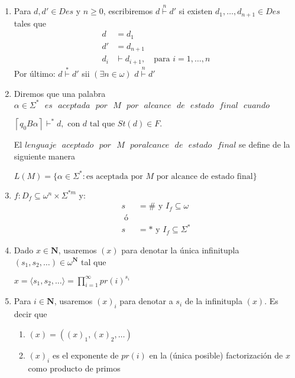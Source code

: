 \documentclass{article}
\begin{document}
\begin{enumerate}
        \item Para $d, d' \in Des$ y $n \geq 0$, escribiremos $d \overset{n}{\vdash} d'$
        si existen $d_1, \dots, d_{n+1} \in Des$ tales que 
        \begin{align*}
                d &= d_1 \\
                d' &= d_{n+1} \\
                d_i &\vdash d_{i+1}, \quad \text{para } i = 1, \ldots, n
        \end{align*}
        Por último: $d \overset{*}{\vdash} d'$ sii $(\exists n \in \omega)$ $d \overset{n}{\vdash} d'$

        \item Diremos que una palabra $\alpha \in \Sigma^{*} \text{ } es \text{ } 
        aceptada \text{ } por \text{ } M \text{ } por \text{ } alcance \text{ }
        de \text{ } estado \text{ } final \text{ } cuando$
        \begin{center}
                $\left\lceil q_0 B \alpha \right\rceil \vdash^* d, 
                \text{ con } d \text{ tal que } St(d) \in F.$
        \end{center}
        El $lenguaje \text{ } aceptado \text{ } por \text{ } M \text{ } por alcance
        \text{ } de \text{ } estado \text{ } final$ se define de la siguiente manera
        \begin{center}
                $L(M) = \{ \alpha \in \Sigma^{*}: \text{es aceptada por } M \text{ por 
                alcance de estado final}\}$
        \end{center}

        \item $f : D_f \subseteq \omega^n \times \Sigma^{*m}$ y:
        \begin{align*}
                s &= \# \text{ y } I_f \subseteq \omega \\
                \text{ ó } \\
                s &= * \text{ y } I_f \subseteq \Sigma^{*}
        \end{align*}

        \item Dado $x \in \mathbf{N}$, usaremos $(x)$ para denotar la única infinitupla
        $(s_1, s_2, \dots) \in \omega^{\mathbf{N}}$ tal que
        \begin{center}
                $x = \langle s_1, s_2, \dots \rangle = \displaystyle \prod_{i=1}^{\infty} pr(i)^{s_i}$
        \end{center}

        \item Para $i \in \mathbf{N}$, usaremos $(x)_i$ para denotar a $s_i$ de la infinitupla
        $(x)$. Es decir que 
        \begin{enumerate}
                \item $(x) = ((x)_1, (x)_2, \dots)$
                \item $(x)_i$ es el exponente de $pr(i)$ en la (única posible) factorización de 
                $x$ como producto de primos

        \end{enumerate}
\end{enumerate}
\end{document}
